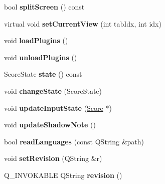\begin{DoxyCompactItemize}
bool {\bfseries split\+Screen} () const
\item 
\mbox{\label{class_ms_1_1_muse_score_abcdb9bf81fbec2861c2b8f76cc7dc781}} 
virtual void {\bfseries set\+Current\+View} (int tab\+Idx, int idx)
\item 
\mbox{\label{class_ms_1_1_muse_score_a5e93f908624a2c93ed05a2684ff97819}} 
void {\bfseries load\+Plugins} ()
\item 
\mbox{\label{class_ms_1_1_muse_score_aacf9208bbf7e2074e86cbe67b15aa8d1}} 
void {\bfseries unload\+Plugins} ()
\item 
\mbox{\label{class_ms_1_1_muse_score_a52cae1e7fa9af0f0943711ec2f75240d}} 
Score\+State {\bfseries state} () const
\item 
\mbox{\label{class_ms_1_1_muse_score_a51478bb2105eba6a4978f635cb798c4f}} 
void {\bfseries change\+State} (Score\+State)
\item 
\mbox{\label{class_ms_1_1_muse_score_a9b67c6d222b52d4d40fc66948cd0747f}} 
void {\bfseries update\+Input\+State} (\hyperlink{class_ms_1_1_score}{Score} $\ast$)
\item 
\mbox{\label{class_ms_1_1_muse_score_a9c21759b61d1953565d7ad7cdc16bff6}} 
void {\bfseries update\+Shadow\+Note} ()
\item 
\mbox{\label{class_ms_1_1_muse_score_a2d419ebfb0953d2a8e02417811fb2509}} 
bool {\bfseries read\+Languages} (const Q\+String \&path)
\item 
\mbox{\label{class_ms_1_1_muse_score_a019edfbf71d515ca5782af72568482f1}} 
void {\bfseries set\+Revision} (Q\+String \&r)
\item 
\mbox{\label{class_ms_1_1_muse_score_a5cfab496490fb2d7f98f2495fd19e06e}} 
Q\+\_\+\+I\+N\+V\+O\+K\+A\+B\+LE Q\+String {\bfseries revision} ()
\item 
\mbox{\label{class_ms_1_1_muse_score_a62ef1ed32c777456d7be43b822507bd9}} 

\end{DoxyCompactItemize}
